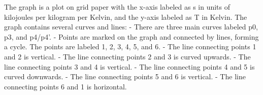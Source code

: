 The graph is a plot on grid paper with the x-axis labeled as s in units of kilojoules per kilogram per Kelvin, and the y-axis labeled as T in Kelvin. The graph contains several curves and lines:
- There are three main curves labeled p0, p3, and p4/p4'.
- Points are marked on the graph and connected by lines, forming a cycle. The points are labeled 1, 2, 3, 4, 5, and 6.
- The line connecting points 1 and 2 is vertical.
- The line connecting points 2 and 3 is curved upwards.
- The line connecting points 3 and 4 is vertical.
- The line connecting points 4 and 5 is curved downwards.
- The line connecting points 5 and 6 is vertical.
- The line connecting points 6 and 1 is horizontal.